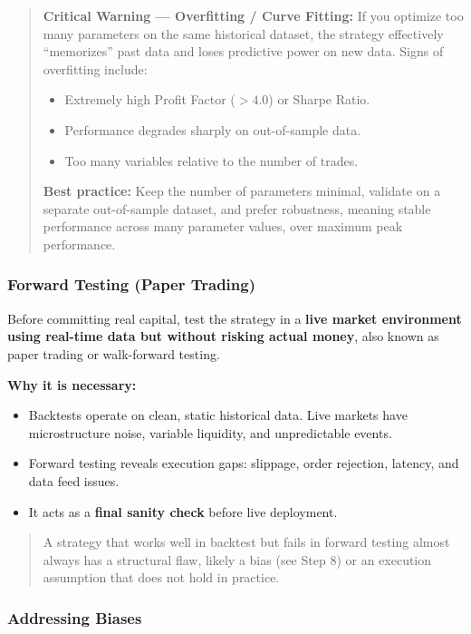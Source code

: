 \documentclass[12pt,openany]{book}
\begin{document}
\begin{quote}
    \textbf{Critical Warning --- Overfitting / Curve Fitting:} If you optimize too many parameters on the same historical dataset, the strategy effectively ``memorizes'' past data and loses predictive power on new data. Signs of overfitting include:
    \begin{itemize}[leftmargin=*]
        \item Extremely high Profit Factor ($> 4.0$) or Sharpe Ratio.
        \item Performance degrades sharply on out-of-sample data.
        \item Too many variables relative to the number of trades.
    \end{itemize}
    \textbf{Best practice:} Keep the number of parameters minimal, validate on a separate out-of-sample dataset, and prefer robustness, meaning stable performance across many parameter values, over maximum peak performance.
\end{quote}

\subsubsection{Forward Testing (Paper Trading)}

Before committing real capital, test the strategy in a \textbf{live market environment using real-time data but without risking actual money}, also known as paper trading or walk-forward testing.

\textbf{Why it is necessary:}
\begin{itemize}[leftmargin=*]
    \item Backtests operate on clean, static historical data. Live markets have microstructure noise, variable liquidity, and unpredictable events.
    \item Forward testing reveals execution gaps: slippage, order rejection, latency, and data feed issues.
    \item It acts as a \textbf{final sanity check} before live deployment.
\end{itemize}

\begin{quote}
    A strategy that works well in backtest but fails in forward testing almost always has a structural flaw, likely a bias (see Step 8) or an execution assumption that does not hold in practice.
\end{quote}

\subsubsection{Addressing Biases}
\end{document}
